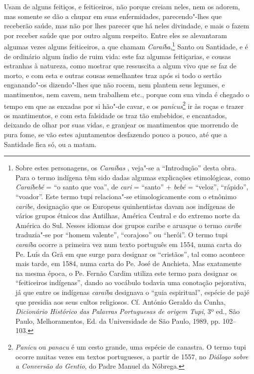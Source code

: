  Usam de alguns feitiços, e feiticeiros, não porque creiam neles, nem os
adorem, mas somente se dão a chupar em suas enfermidades,
parecendo"-lhes que receberão saúde, mas não por lhes parecer que há
neles divindade, e mais o fazem por receber saúde que por outro algum
respeito. Entre eles se alevantaram algumas vezes alguns feiticeiros, a
que chamam \textit{Caraíba},\footnote{ Sobre estes personagens, os
\textit{Caraíbas }, veja"-se a ``Introdução'' desta obra. Para o termo
indígena têm sido dadas algumas explicações etimológicas, como
\textit{Caraíbebé} = ``o santo que voa'', de \textit{cari} = ``santo'' +
\textit{bebé} = ``veloz'', ``rápido'', ``voador''. Este termo tupi
relaciona"-se etimologicamente com o etnônimo \textit{caribe},
designação que os Europeus quinhentistas davam aos indígenas de vários
grupos étnicos das Antilhas, América Central e do extremo norte da
América do Sul. Nesses idiomas dos grupos caribe e aruaque o termo
\textit{caribe} traduzia"-se por ``homem valente'', ``corajoso'' ou ``herói''.
O termo tupi \textit{caraíba} ocorre a primeira vez num texto português
em 1554, numa carta do Pe. Luís da Grã em que surge
para designar os ``cristãos'', tal como acontece mais tarde, em 1584, 
numa carta do Pe. José de Anchieta. Mas exatamente na mesma
época, o Pe. Fernão Cardim utiliza este termo para designar os
``feiticeiros indígenas'', dando ao vocábulo todavia uma conotação
pejorativa, já que entre os indígenas \textit{caraíba} designava o
``guia espiritual'', espécie de pajé que presidia aos seus cultos
religiosos. Cf. António Geraldo da Cunha, \textit{Dicionário Histórico
das Palavras Portuguesas de origem Tupi}, 3º ed., São Paulo,
Melhoramentos, Ed. da Universidade de São Paulo, 1989, pp. 102--103.} 
Santo ou Santidade, e é de ordinário algum índio de ruim vida: este faz 
algumas feitiçarias, e cousas estranhas à natureza, como mostrar que 
ressuscita a algum vivo que se faz de morto, e com esta e outras cousas semelhantes traz após si todo
o sertão enganando"-os dizendo"-lhes que não rocem, nem plantem seus
legumes, e mantimentos, nem cavem, nem trabalhem etc., porque com sua
vinda é chegado o tempo em que as enxadas por si hão"-de cavar, e os
\textit{panicus}\footnote{ \textit{Panicu} ou \textit{panacu} é um
cesto grande, uma espécie de canastra. O termo tupi ocorre muitas vezes
em textos portugueses, a partir de 1557, no \textit{Diálogo sobre a
Conversão do Gentio}, do Padre Manuel da Nóbrega.} ir às roças
e trazer os mantimentos, e com esta falsidade os traz tão embebidos, e
encantados, deixando de olhar por suas vidas, e granjear os mantimentos
que morrendo de pura fome, se vão estes ajuntamentos desfazendo pouco a
pouco, até que a Santidade fica só, ou a matam.

